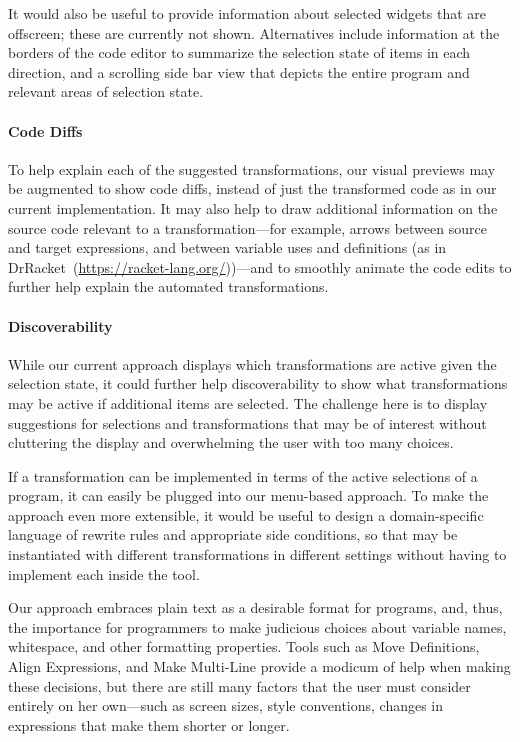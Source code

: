 It would also be useful to provide information about selected
widgets that are offscreen; these are currently not shown.
Alternatives include information at the borders of the code editor to
summarize the selection state of items in each direction, and a
scrolling side bar view that depicts the entire program and relevant
areas of selection state.


\paragraph{Code Diffs}
To help explain each of the suggested transformations, our visual previews may
be augmented to show code diffs, instead of just the transformed code as in
our current implementation.  It may also help to draw additional
information on the source code relevant to a transformation---for
example, arrows between source and target expressions, and between
variable uses and definitions (as in
DrRacket~(\url{https://racket-lang.org/}))---and to smoothly
animate the code edits to further help explain the automated
transformations.

\paragraph{Discoverability}
While our current approach displays which transformations are active
given the selection state, it could further help discoverability to
show what transformations may be active if additional items are
selected. The challenge here is to display suggestions for selections
and transformations that may be of interest without cluttering the
display and overwhelming the user with too many choices.



If a \little{} transformation can be implemented in terms of the
active selections of a program, it can easily be plugged into our
menu-based approach. To make the approach even more extensible, it would be
useful to design a domain-specific language of rewrite rules and
appropriate side conditions, so that
\deuce{} may be instantiated with different transformations in
different settings without having to implement each inside the tool.



Our approach embraces plain text as a desirable format for programs,
and, thus, the importance for programmers to make judicious choices about
variable names, whitespace, and other formatting properties. Tools
such as Move Definitions, Align Expressions, and Make Multi-Line
provide a modicum of
help when making these decisions, but there are still many factors
that the user must consider entirely on her own---such as
screen sizes, style
conventions, changes in expressions that make them shorter or longer.

